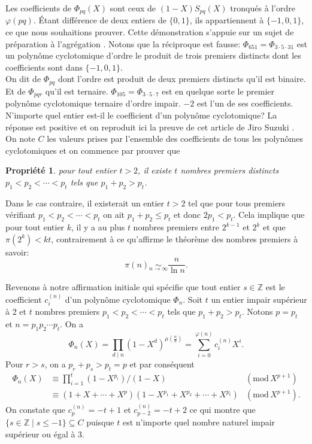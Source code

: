\documentclass{article}
\theoremstyle{break}                  %
\newtheorem{propriete}{Propriété}
\begin{document}
Les coefficients de $\Phi_{pq}(X)$ sont ceux de $(1-X) S_{pq}(X)$ tronqués à l'ordre $\varphi(pq)$. Étant différence de deux entiers de $\{0,1\}$, ils appartiennent à $\{-1,0,1\}$, ce que nous souhaitions prouver. Cette démonstration s'appuie sur un sujet de préparation à l'agrégation \cite{agreg}.  Notons que la réciproque est fausse: $\Phi_{651} = \Phi_{3 \cdot 5 \cdot 31}$ est un polynôme cyclotomique d'ordre le produit de trois premiers distincts dont les coefficients sont dans $\{-1,0,1\}$.\\

On dit de $\Phi_{pq}$ dont l'ordre est produit de deux premiers distincts qu'il est binaire. Et de $\Phi_{pqr}$ qu'il est ternaire. $\Phi_{105} = \Phi_{3 \cdot 5 \cdot 7}$ est en quelque sorte le premier polynôme cyclotomique ternaire d'ordre impair. $-2$ est l'un de ses coefficients. N'importe quel entier est-il le coefficient d'un polynôme cyclotomique? La réponse est positive et on reproduit ici la preuve de cet article de Jiro Suzuki \cite{range}.\\

On note $C$ les valeurs prises par l'ensemble des coefficients de tous les polynômes cyclotomiques et on commence par prouver que
\begin{propriete}
	pour tout entier $t > 2$, il existe $t$ nombres premiers distincts $p_1 < p_2 < \cdots < p_t$ tels que $p_1+p_2 > p_t$.
\end{propriete}
Dans le cas contraire, il existerait un entier $t > 2$ tel que pour tous premiers vérifiant $p_1 < p_2 < \cdots < p_t$ on ait $p_1+p_2 \le p_t$ et donc $2 p_1 < p_t$. Cela implique que pour tout entier $k$, il y a au plus $t$ nombres premiers entre $2^{k-1}$ et $2^k$ et que $\pi(2^k) < kt$, contrairement à ce qu'affirme le théorème des nombres premiers à savoir: 
$$\pi(n) \underset{n \to \infty}{\sim} \frac{n}{\ln n}.$$

Revenons à notre affirmation initiale qui spécifie que tout entier $s \in \mathbb Z$ est le coefficient $c_i^{(n)}$ d'un polynôme cyclotomique $\Phi_n$. Soit $t$ un entier impair supérieur à 2 et $t$ nombres premiers $p_1 < p_2 < \cdots < p_t$ tels que $p_1+p_2 > p_t$. Notons $p = p_t$ et $n = p_1 p_2 \cdots p_t$. On a
$$\Phi_n(X) = \prod_{d \mid n} (1-X^d)^{\mu(\frac{n}{d})} = \sum_{i = 0}^{\varphi(n)} c_i^{(n)} X^i.$$
Pour $r > s$, on a $p_r + p_s > p_t = p$ et par conséquent
\begin{align*}
	\Phi_n(X) &\equiv \prod_{i=1}^{t} (1-X^{p_i})/(1-X) &(\mathrm{mod} \, X^{p+1})\\
	&\equiv (1 + X + \cdots + X^p)(1 - X^{p_1}+X^{p_2}+\cdots+X^{p_t})  &(\mathrm{mod} \, X^{p+1}).
\end{align*}
On constate que $c_p^{(n)}=-t+1$ et $c_{p-2}^{(n)}=-t+2$ ce qui montre que $\{s \in \mathbb Z \mid s \le -1\} \subseteq C$ puisque $t$ est n'importe quel nombre naturel impair supérieur ou égal à $3$.\\
\end{document}
